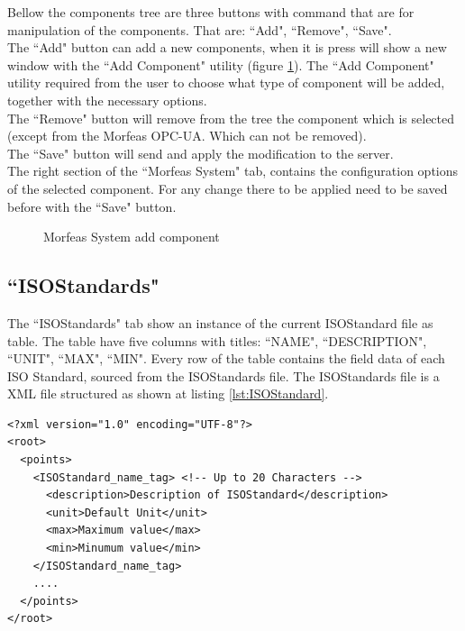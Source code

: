 Bellow the components tree are three buttons with command that are for manipulation of the components.
That are: ``Add", ``Remove", ``Save".\\

\noindent The ``Add" button can add a new components, when it is press will show a new window with the ``Add Component" utility
(figure \ref{fig:Morfeas_sys_conf_add_comp}).
The ``Add Component" utility required from the user to choose what type of component will be added, together with the necessary options.\\

\noindent The ``Remove" button will remove from the tree the component which is selected (except from the Morfeas OPC-UA. Which can not be removed).\\

\noindent The ``Save" button will send and apply the modification to the server.\\

The right section of the ``Morfeas System" tab, contains the configuration options of the selected component.
For any change there to be applied need to be saved before with the ``Save" button.

\begin{figure}[h]
\centering
	\caption{Morfeas System add component}
	\label{fig:Morfeas_sys_conf_add_comp}
\end{figure}

\newpage
\subsection{``ISOStandards"}
The ``ISOStandards" tab show an instance of the current ISOStandard file as table.
The table have five columns with titles: ``NAME", ``DESCRIPTION", ``UNIT", ``MAX", ``MIN".
Every row of the table contains the field data of each ISO Standard, sourced from the ISOStandards file.
The ISOStandards file is a XML file structured as shown at listing \ref{lst:ISOStandard}.

\begin{lstlisting}[frame=single,caption=Structure of ISOstandard file,label=lst:ISOStandard]
<?xml version="1.0" encoding="UTF-8"?>
<root>
  <points>
    <ISOStandard_name_tag> <!-- Up to 20 Characters -->
      <description>Description of ISOStandard</description>
      <unit>Default Unit</unit>
      <max>Maximum value</max>
      <min>Minumum value</min>
    </ISOStandard_name_tag>
    ....
  </points>
</root>
\end{lstlisting}

